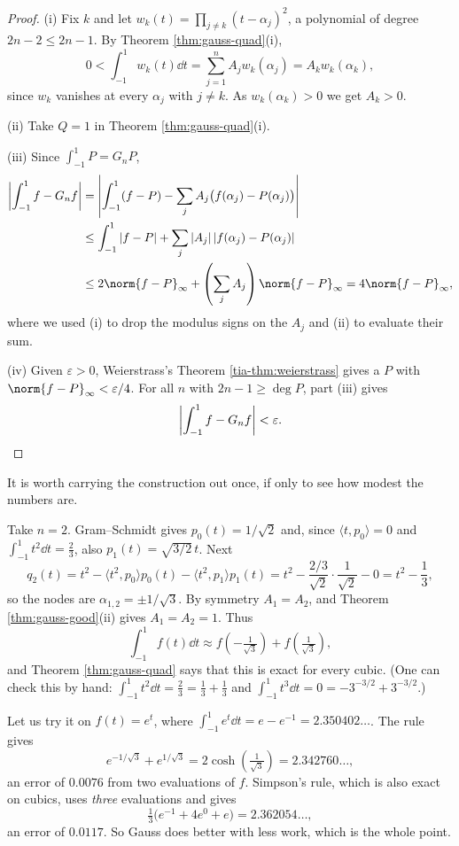 \begin{proof}
	(i) Fix $k$ and let $w_k(t) = \prod_{j\neq k}(t-\alpha_j)^2$, a polynomial of degree $2n-2 \leq 2n-1$. By Theorem \ref{thm:gauss-quad}(i),
	$$0 < \int_{-1}^1 w_k(t)\dd t = \sum_{j=1}^n A_jw_k(\alpha_j) = A_kw_k(\alpha_k),$$
	since $w_k$ vanishes at every $\alpha_j$ with $j \neq k$. As $w_k(\alpha_k)>0$ we get $A_k>0$.

	(ii) Take $Q = 1$ in Theorem \ref{thm:gauss-quad}(i).

	(iii) Since $\int_{-1}^1 P = G_nP$,
	\begin{align*}
		\left|\int_{-1}^1 f - G_nf\right| &= \left|\int_{-1}^1(f-P) - \sum_j A_j\big(f(\alpha_j)-P(\alpha_j)\big)\right|\\
		&\leq \int_{-1}^1|f-P| + \sum_j |A_j|\,|f(\alpha_j)-P(\alpha_j)|\\
		&\leq 2\norm{f-P}_\infty + \left(\sum_j A_j\right)\norm{f-P}_\infty = 4\norm{f-P}_\infty,
	\end{align*}
	where we used (i) to drop the modulus signs on the $A_j$ and (ii) to evaluate their sum.

	(iv) Given $\varepsilon>0$, Weierstrass's Theorem \ref{tia-thm:weierstrass} gives a $P$ with $\norm{f-P}_\infty<\varepsilon/4$. For all $n$ with $2n-1\geq\deg P$, part (iii) gives
	$$\left|\int_{-1}^1f - G_nf\right| < \varepsilon. \qedhere$$
\end{proof}

It is worth carrying the construction out once, if only to see how modest the numbers are.

\begin{example}
	Take $n = 2$. Gram--Schmidt gives $p_0(t) = 1/\sqrt2$ and, since $\langle t,p_0\rangle = 0$ and $\int_{-1}^1t^2\dd t = \tfrac23$, also $p_1(t) = \sqrt{3/2}\,t$. Next
	$$q_2(t) = t^2 - \langle t^2,p_0\rangle p_0(t)-\langle t^2,p_1\rangle p_1(t) = t^2 - \frac{2/3}{\sqrt2}\cdot\frac{1}{\sqrt2} - 0 = t^2-\frac13,$$
	so the nodes are $\alpha_{1,2} = \pm 1/\sqrt3$. By symmetry $A_1 = A_2$, and Theorem \ref{thm:gauss-good}(ii) gives $A_1=A_2=1$. Thus
	$$\int_{-1}^1 f(t)\dd t \approx f\!\left(-\tfrac{1}{\sqrt3}\right)+f\!\left(\tfrac1{\sqrt3}\right),$$
	and Theorem \ref{thm:gauss-quad} says that this is exact for every cubic. (One can check this by hand: $\int_{-1}^1t^2\dd t = \tfrac23 = \tfrac13+\tfrac13$ and $\int_{-1}^1t^3\dd t = 0 = -3^{-3/2}+3^{-3/2}$.)

	Let us try it on $f(t)=e^t$, where $\int_{-1}^1e^t\dd t = e - e^{-1} = 2.350402\ldots$. The rule gives
	$$e^{-1/\sqrt3}+e^{1/\sqrt3} = 2\cosh\!\left(\tfrac{1}{\sqrt3}\right) = 2.342760\ldots,$$
	an error of $0.0076$ from two evaluations of $f$. Simpson's rule, which is also exact on cubics, uses \emph{three} evaluations and gives
	$$\tfrac13\big(e^{-1}+4e^0+e\big) = 2.362054\ldots,$$
	an error of $0.0117$. So Gauss does better with less work, which is the whole point.
\end{example}

